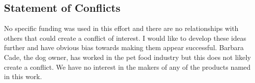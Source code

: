 \documentclass[aps,secnumarabic,balancelastpage,amsmath,amssymb,nofootinbib]{revtex4}
\begin{document}
\clearpage
\appendix

\begin{mdpicomment}

\section{ Statement of Conflicts }
 No specific funding was used in this effort and there are no relationships
with others that could create a conflict of interest. I would like to develop
these ideas further and have obvious bias towards making them appear 
successful. Barbara Cade, the dog owner, has worked in the pet food industry
but this does not likely create a conflict. We have no interest in the
makers of any of the products named in this work.  

\end{mdpicomment}
\end{document}
